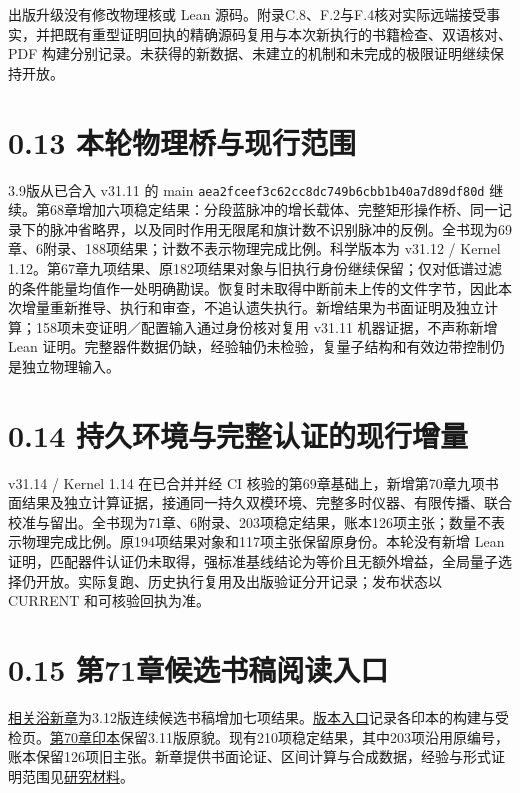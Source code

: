 \documentclass[
  11pt,
  oneside]{book}
\begin{document}
出版升级没有修改物理核或 Lean
源码。附录C.8、F.2与F.4核对实际远端接受事实，并把既有重型证明回执的精确源码复用与本次新执行的书籍检查、双语核对、PDF
构建分别记录。未获得的新数据、未建立的机制和未完成的极限证明继续保持开放。

\section{0.13 本轮物理桥与现行范围}

3.9版从已合入 v31.11 的 main
\texttt{aea2fceef3c6\allowbreak 2cc8dc749b6c\allowbreak bb1b40a7d89d\allowbreak f80d}
继续。第68章增加六项稳定结果：分段蓝脉冲的增长载体、完整矩形操作桥、同一记录下的脉冲省略界，以及同时作用无限尾和旗计数不识别脉冲的反例。全书现为69章、6附录、188项结果；计数不表示物理完成比例。科学版本为
v31.12 / Kernel
1.12。第67章九项结果、原182项结果对象与旧执行身份继续保留；仅对低谱过滤的条件能量均值作一处明确勘误。恢复时未取得中断前未上传的文件字节，因此本次增量重新推导、执行和审查，不追认遗失执行。新增结果为书面证明及独立计算；158项未变证明／配置输入通过身份核对复用
v31.11 机器证据，不声称新增 Lean
证明。完整器件数据仍缺，经验轴仍未检验，复量子结构和有效边带控制仍是独立物理输入。

\section{0.14 持久环境与完整认证的现行增量}

v31.14 / Kernel 1.14 在已合并并经 CI
核验的第69章基础上，新增第70章九项书面结果及独立计算证据，接通同一持久双模环境、完整多时仪器、有限传播、联合校准与留出。全书现为71章、6附录、203项稳定结果，账本126项主张；数量不表示物理完成比例。原194项结果对象和117项主张保留原身份。本轮没有新增
Lean
证明，匹配器件认证仍未取得，强标准基线结论为等价且无额外增益，全局量子选择仍开放。实际复跑、历史执行复用及出版验证分开记录；发布状态以
CURRENT 和可核验回执为准。

\section{0.15 第71章候选书稿阅读入口}

\protect\hyperlink{ch-71}{相关浴新章}为3.12版连续候选书稿增加七项结果。\href{README.md}{版本入口}记录各印本的构建与受检页。\href{https://github.com/MurphyHoops/UEOT/blob/a3f95dc1a6821978\allowbreak e173e23015f02699\allowbreak 4fb60c65/physics/qm/book/UEOT_PHYSICS.pdf}{第70章印本}保留3.11版原貌。现有210项稳定结果，其中203项沿用原编号，账本保留126项旧主张。新章提供书面论证、区间计算与合成数据，经验与形式证明范围见\href{../correlated_bath/README.md}{研究材料}。
\end{document}
